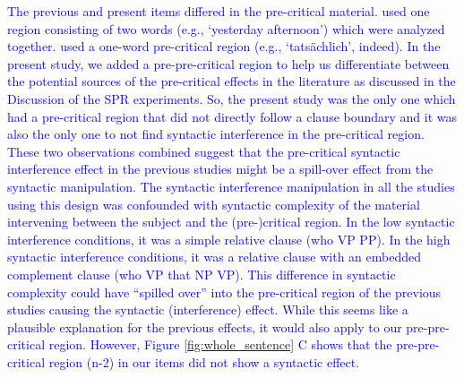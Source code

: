 \documentclass[a4paper, man, floatsintext]{apa7}
\begin{document}
\textcolor{blue}{The previous and present items differed in the pre-critical material. \citet{vandyke07} used one region consisting of two words (e.g., `yesterday afternoon') which were analyzed together. \textcite{mertzen} used a one-word pre-critical region (e.g., `tatsächlich', indeed). In the present study, we added a pre-pre-critical region to help us differentiate between the potential sources of the pre-critical effects in the literature as discussed in the Discussion of the SPR experiments. So, the present study was the only one which had a pre-critical region that did not directly follow a clause boundary and it was also the only one to not find syntactic interference in the pre-critical region. These two observations combined suggest that the pre-critical syntactic interference effect in the previous studies might be a spill-over effect from the syntactic manipulation. The syntactic interference manipulation in all the studies using this design was confounded with syntactic complexity of the material intervening between the subject and the (pre-)critical region. In the low syntactic interference conditions, it was a simple relative clause (who VP PP). In the high syntactic interference conditions, it was a relative clause with an embedded complement clause (who VP that NP VP). This difference in syntactic complexity could have ``spilled over'' into the pre-critical region of the previous studies causing the syntactic (interference) effect. While this seems like a plausible explanation for the previous effects, it would also apply to our pre-pre-critical region. However, Figure \ref{fig:whole_sentence} C shows that the pre-pre-critical region (n-2) in our items did not show a syntactic effect.}

\label{comma}
\end{document}
